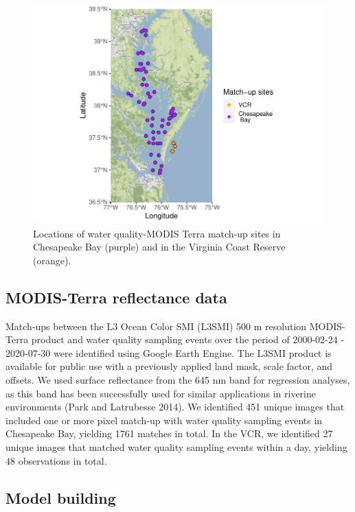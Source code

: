\documentclass[11pt,]{article}
\begin{document}
\begin{figure}
\centering
\includegraphics{ssrs_sp2020_files/figure-latex/cb-map1-1.pdf}
\caption{Locations of water quality-MODIS Terra match-up sites in
Chesapeake Bay (purple) and in the Virginia Coast Reserve (orange).}
\end{figure}

\hypertarget{modis-terra-reflectance-data}{%
\subsection{MODIS-Terra reflectance
data}\label{modis-terra-reflectance-data}}

Match-ups between the L3 Ocean Color SMI (L3SMI) 500 m resolution
MODIS-Terra product and water quality sampling events over the period of
2000-02-24 - 2020-07-30 were identified using Google Earth Engine. The
L3SMI product is available for public use with a previously applied land
mask, scale factor, and offsets. We used surface reflectance from the
645 nm band for regression analyses, as this band has been successfully
used for similar applications in riverine environments (Park and
Latrubesse 2014). We identified 451 unique images that included one or
more pixel match-up with water quality sampling events in Chesapeake
Bay, yielding 1761 matches in total. In the VCR, we identified 27 unique
images that matched water quality sampling events within a day, yielding
48 observations in total.

\hypertarget{model-building}{%
\subsection{Model building}\label{model-building}}
\end{document}
